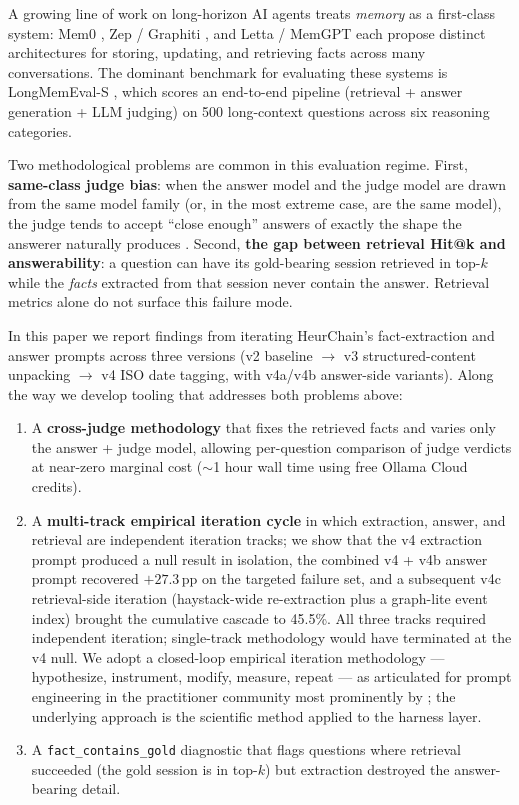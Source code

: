 \documentclass{article}
\begin{document}
A growing line of work on long-horizon AI agents treats \emph{memory} as a first-class system: Mem0 \citep{mem0_2025}, Zep / Graphiti \citep{zep_2025}, and Letta / MemGPT \citep{memgpt_2023} each propose distinct architectures for storing, updating, and retrieving facts across many conversations. The dominant benchmark for evaluating these systems is LongMemEval-S \citep{longmemeval_2025}, which scores an end-to-end pipeline (retrieval + answer generation + LLM judging) on 500 long-context questions across six reasoning categories.

Two methodological problems are common in this evaluation regime. First, \textbf{same-class judge bias}: when the answer model and the judge model are drawn from the same model family (or, in the most extreme case, are the same model), the judge tends to accept ``close enough'' answers of exactly the shape the answerer naturally produces \citep{llm_judge_2023}. Second, \textbf{the gap between retrieval Hit@k and answerability}: a question can have its gold-bearing session retrieved in top-$k$ while the \emph{facts} extracted from that session never contain the answer. Retrieval metrics alone do not surface this failure mode.

In this paper we report findings from iterating HeurChain's fact-extraction and answer prompts across three versions (v2 baseline $\to$ v3 structured-content unpacking $\to$ v4 ISO date tagging, with v4a/v4b answer-side variants). Along the way we develop tooling that addresses both problems above:

\begin{enumerate}
  \item A \textbf{cross-judge methodology} that fixes the retrieved facts and varies only the answer + judge model, allowing per-question comparison of judge verdicts at near-zero marginal cost ($\sim$1 hour wall time using free Ollama Cloud credits).
  \item A \textbf{multi-track empirical iteration cycle} in which extraction, answer, and retrieval are independent iteration tracks; we show that the v4 extraction prompt produced a null result in isolation, the combined v4 + v4b answer prompt recovered $+27.3$\,pp on the targeted failure set, and a subsequent v4c retrieval-side iteration (haystack-wide re-extraction plus a graph-lite event index) brought the cumulative cascade to 45.5\%. All three tracks required independent iteration; single-track methodology would have terminated at the v4 null. We adopt a closed-loop empirical iteration methodology --- hypothesize, instrument, modify, measure, repeat --- as articulated for prompt engineering in the practitioner community most prominently by \citet{karpathy2024notes}; the underlying approach is the scientific method applied to the harness layer.
  \item A \texttt{fact\_contains\_gold} diagnostic that flags questions where retrieval succeeded (the gold session is in top-$k$) but extraction destroyed the answer-bearing detail.
\end{enumerate}
\end{document}
